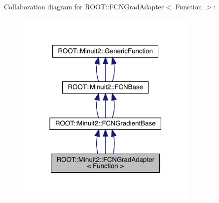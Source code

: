 Collaboration diagram for R\+O\+OT\+:\+:F\+C\+N\+Grad\+Adapter$<$ Function $>$\+:
\nopagebreak
\begin{figure}[H]
\begin{center}
\leavevmode
\includegraphics[width=249pt]{d7/dd3/classROOT_1_1Minuit2_1_1FCNGradAdapter__coll__graph}
\end{center}
\end{figure}
